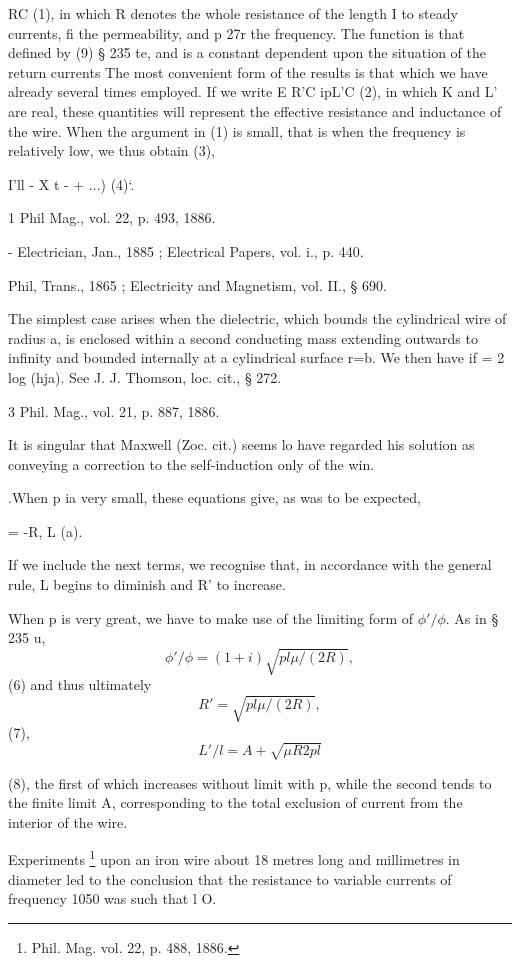 RC
(1),
in which R denotes the whole resistance of the length I to
steady currents, fi the permeability, and p 27r the frequency. The
function  is that defined by (9) § 235 te, and is a constant
dependent upon the situation of the return currents
The most convenient form of the results is that which we have
already several times employed. If we write
E R'C ipL'C
(2),
in which K and L' are real, these quantities will represent the
effective resistance and inductance of the wire. When the argument in (1) is
small, that is when the frequency is relatively low,
we thus obtain
(3),

I'll - X t - + ...) (4)‘.


1 Phil Mag., vol. 22, p. 493, 1886.

- Electrician, Jan., 1885 ; Electrical Papers, vol. i., p. 440.

 Phil, Trans., 1865 ; Electricity and Magnetism, vol. II., § 690.

 The simplest case arises when the dielectric, which bounds the cylindrical
wire of radius a, is enclosed within a second conducting mass extending outwards
to infinity and bounded internally at a cylindrical surface r=b. We then have
if = 2 log (hja). See J. J. Thomson, loc. cit., § 272.

3 Phil. Mag., vol. 21, p. 887, 1886.

It is singular that Maxwell (Zoc. cit.) seems lo have regarded his solution as
conveying a correction to the self-induction only of the win.

.When p ia very small, these equations give, as was to be
expected,

 = -R, L (a).

If we include the next terms, we recognise that, in accordance
with the general rule, L begins to diminish and R' to increase.

When p is very great, we have to make use of the limiting
form of
\( \phi' /  \phi\).
As in § 235 u,
\[ \phi' /  \phi = (1 + i) \sqrt{ p l \mu /(2 R) }, \]
(6) and thus ultimately
\[ R'  = \sqrt{ p l \mu /(2 R) }, \]
(7),
\[ L'/l = A  + \sqrt{\mu R 2 pl }\]

(8), the first of which increases without limit with p, while the second
tends to the finite limit A, corresponding to the total exclusion of
current from the interior of the wire.

Experiments \footnote{Phil. Mag. vol. 22, p. 488, 1886.}
upon an iron wire about 18 metres long and
millimetres in diameter led to the conclusion that the resistance
to variable currents of frequency 1050 was such that l O.

